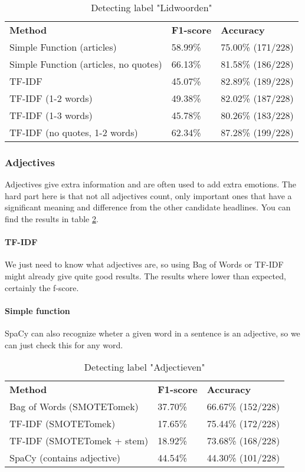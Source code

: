 \documentclass{article}
\begin{document}
\begin{table}[]
\begin{tabular}{lll}
\textbf{Method}                       & \textbf{F1-score} & \textbf{Accuracy} \\
Simple Function (articles)            & 58.99\%           & 75.00\% (171/228) \\
Simple Function (articles, no quotes) & 66.13\%           & 81.58\% (186/228) \\
TF-IDF                                & 45.07\%           & 82.89\% (189/228) \\
TF-IDF (1-2 words)                    & 49.38\%           & 82.02\% (187/228) \\
TF-IDF (1-3 words)                    & 45.78\%           & 80.26\% (183/228) \\
TF-IDF (no quotes, 1-2 words)         & 62.34\%           & 87.28\% (199/228)
\end{tabular}
\caption{Detecting label "Lidwoorden"}
\label{tab:articles}
\end{table}

\subsubsection{Adjectives}
Adjectives give extra information and are often used to add extra emotions. The hard part here is that not all adjectives count, only important ones that have a significant meaning and difference from the other candidate headlines. \cite{soubry} You can find the results in table \ref{tab:adjectives}.

\paragraph{TF-IDF} We just need to know what adjectives are, so using Bag of Words or TF-IDF might already give quite good results. The results where lower than expected, certainly the f-score.

\paragraph{Simple function} SpaCy can also recognize wheter a given word in a sentence is an adjective, so we can just check this for any word.

\begin{table}[]
\begin{tabular}{lll}
\textbf{Method}            & \textbf{F1-score} & \textbf{Accuracy} \\
Bag of Words (SMOTETomek)  & 37.70\%           & 66.67\% (152/228) \\
TF-IDF (SMOTETomek)        & 17.65\%           & 75.44\% (172/228) \\
TF-IDF (SMOTETomek + stem) & 18.92\%           & 73.68\% (168/228) \\
SpaCy (contains adjective) & 44.54\%           & 44.30\% (101/228)
\end{tabular}\caption{Detecting label "Adjectieven"}
\label{tab:adjectives}
\end{table}
\end{document}
